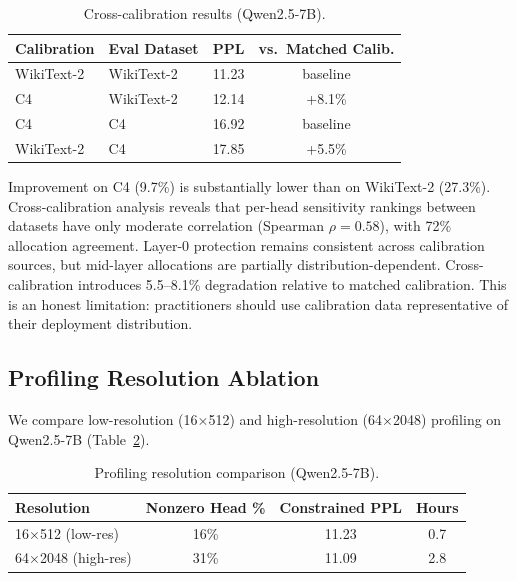 \documentclass[11pt]{article}
\begin{document}
\begin{table}[h]
\centering
\caption{Cross-calibration results (Qwen2.5-7B).}
\label{tab:crosscalib}
\begin{tabular}{llcc}
\toprule
\textbf{Calibration} & \textbf{Eval Dataset} & \textbf{PPL} & \textbf{vs.\ Matched Calib.} \\
\midrule
WikiText-2 & WikiText-2 & 11.23 & baseline \\
C4         & WikiText-2 & 12.14 & +8.1\% \\
C4         & C4         & 16.92 & baseline \\
WikiText-2 & C4         & 17.85 & +5.5\% \\
\bottomrule
\end{tabular}
\end{table}

Improvement on C4 (9.7\%) is substantially lower than on WikiText-2 (27.3\%).
Cross-calibration analysis reveals that per-head sensitivity rankings between datasets have only moderate correlation (Spearman $\rho = 0.58$), with 72\% allocation agreement.
Layer-0 protection remains consistent across calibration sources, but mid-layer allocations are partially distribution-dependent.
Cross-calibration introduces 5.5--8.1\% degradation relative to matched calibration.
This is an honest limitation: practitioners should use calibration data representative of their deployment distribution.

\subsection{Profiling Resolution Ablation}
\label{sec:profiling}

We compare low-resolution (16$\times$512) and high-resolution (64$\times$2048) profiling on Qwen2.5-7B (Table~\ref{tab:profiling}).

\begin{table}[h]
\centering
\caption{Profiling resolution comparison (Qwen2.5-7B).}
\label{tab:profiling}
\begin{tabular}{lccc}
\toprule
\textbf{Resolution} & \textbf{Nonzero Head \%} & \textbf{Constrained PPL} & \textbf{Hours} \\
\midrule
16$\times$512 (low-res)  & 16\% & 11.23 & 0.7 \\
64$\times$2048 (high-res) & 31\% & 11.09 & 2.8 \\
\bottomrule
\end{tabular}
\end{table}
\end{document}
